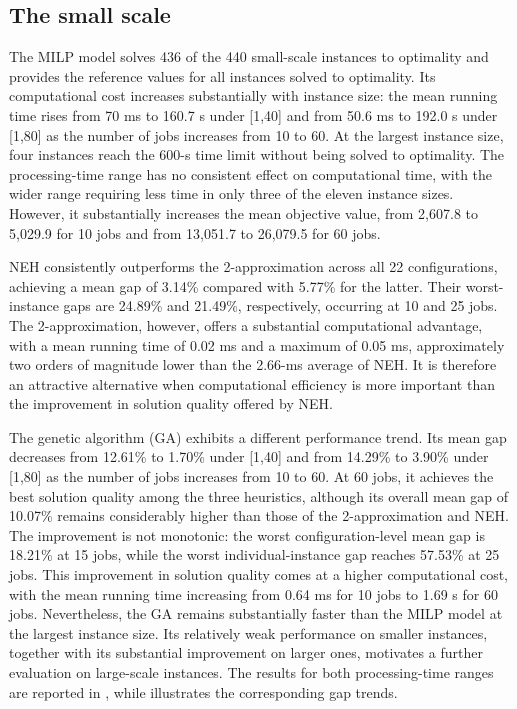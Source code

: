 ﻿\documentclass[12pt]{article}
\begin{document}
\begin{sloppypar}
\subsection{The small scale}

The MILP model solves 436 of the 440 small-scale instances to optimality and 
provides the reference values for all instances solved to optimality. 
Its computational cost increases substantially with instance size: 
the mean running time rises from 70 ms to 160.7 s under [1,40] and from 50.6 ms to 192.0 s under [1,80] 
as the number of jobs increases from 10 to 60. 
At the largest instance size, four instances reach the 600-s time limit without being solved to optimality. 
The processing-time range has no consistent effect on computational time, 
with the wider range requiring less time in only three of the eleven instance sizes. 
However, it substantially increases the mean objective value, 
from 2,607.8 to 5,029.9 for 10 jobs and from 13,051.7 to 26,079.5 for 60 jobs.

NEH consistently outperforms the 2-approximation across all 22 configurations, 
achieving a mean gap of 3.14\% compared with 5.77\% for the latter. 
Their worst-instance gaps are 24.89\% and 21.49\%, respectively, occurring at 10 and 25 jobs. 
The 2-approximation, however, offers a substantial computational advantage, 
with a mean running time of 0.02 ms and a maximum of 0.05 ms, 
approximately two orders of magnitude lower than the 2.66-ms average of NEH. 
It is therefore an attractive alternative when computational efficiency is more important 
than the improvement in solution quality offered by NEH.

The genetic algorithm (GA) exhibits a different performance trend. 
Its mean gap decreases from 12.61\% to 1.70\% under [1,40] and from 14.29\% to 3.90\% under [1,80] 
as the number of jobs increases from 10 to 60. 
At 60 jobs, it achieves the best solution quality among the three heuristics, 
although its overall mean gap of 10.07\% remains considerably higher than those of the 2-approximation and NEH. 
The improvement is not monotonic: the worst configuration-level mean gap is 18.21\% at 15 jobs, 
while the worst individual-instance gap reaches 57.53\% at 25 jobs. 
This improvement in solution quality comes at a higher computational cost, 
with the mean running time increasing from 0.64 ms for 10 jobs to 1.69 s for 60 jobs. 
Nevertheless, the GA remains substantially faster than the MILP model at the largest instance size. 
Its relatively weak performance on smaller instances, together with its substantial improvement on larger ones, 
motivates a further evaluation on large-scale instances. 
The results for both processing-time ranges are reported in , 
while  illustrates the corresponding gap trends.


\end{sloppypar}
\end{document}

